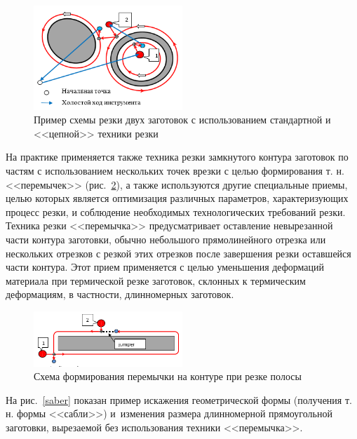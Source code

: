 \documentclass[11pt,twoside,openany]{report}
\begin{document}
\begin{figure}[h]
  \begin{center}
  \includegraphics[width=0.5\textwidth]{chain.png}
  \caption{Пример схемы резки двух заготовок с использованием стандартной и <<цепной>> техники резки}
  \label{chain}
  \end{center}
\end{figure}

На практике применяется также техника резки
замкнутого контура заготовок по частям
с использованием нескольких точек врезки
с целью формирования т. н. <<перемычек>>
(рис.~\ref{jumper}),
а также используются другие специальные приемы,
целью которых является оптимизация различных параметров,
характеризующих процесс резки,
и соблюдение необходимых технологических требований резки.
Техника резки <<перемычка>> предусматривает
оставление невырезанной части контура заготовки,
обычно небольшого прямолинейного отрезка или нескольких отрезков
с резкой этих отрезков после завершения резки оставшейся части контура.
Этот прием применяется с целью уменьшения деформаций материала
при термической резке заготовок, склонных к термическим деформациям,
в частности, длинномерных заготовок.

\begin{figure}[h]
  \begin{center}
  \includegraphics[width=0.5\textwidth]{jumper.png}
  \caption{Схема формирования перемычки на контуре при резке полосы}
  \label{jumper}
  \end{center}
\end{figure}

На рис.~\ref{saber} показан пример искажения геометрической формы
(получения т. н. формы <<сабли>>)
и~изменения размера длинномерной прямоугольной заготовки,
вырезаемой без использования техники <<перемычка>>.
\end{document}
